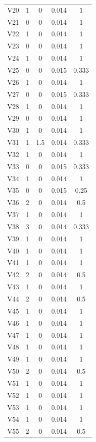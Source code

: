 \documentclass[a4paper, 12pt, openright, oneside, german, french, english, brazil]{abntex2}
\begin{document}
\begin{SingleSpace}
\begin{footnotesize}
\begin{center}
\begin{longtable}{c c c c c}
					V20 & 1 & 0 & 0.014 & 1 \\ 
					V21 & 0 & 0 & 0.014 & 1 \\ 
					V22 & 1 & 0 & 0.014 & 1 \\ 
					V23 & 0 & 0 & 0.014 & 1 \\ 
					V24 & 1 & 0 & 0.014 & 1 \\ 
					V25 & 0 & 0 & 0.015 & 0.333 \\ 
					V26 & 1 & 0 & 0.014 & 1 \\ 
					V27 & 0 & 0 & 0.015 & 0.333 \\ 
					V28 & 1 & 0 & 0.014 & 1 \\ 
					V29 & 0 & 0 & 0.014 & 1 \\ 
					V30 & 1 & 0 & 0.014 & 1 \\ 
					V31 & 1 & 1.5 & 0.014 & 0.333 \\ 
					V32 & 1 & 0 & 0.014 & 1 \\ 
					V33 & 0 & 0 & 0.015 & 0.333 \\ 
					V34 & 1 & 0 & 0.014 & 1 \\ 
					V35 & 0 & 0 & 0.015 & 0.25 \\ 
					V36 & 2 & 0 & 0.014 & 0.5 \\ 
					V37 & 1 & 0 & 0.014 & 1 \\ 
					V38 & 3 & 0 & 0.014 & 0.333 \\ 
					V39 & 1 & 0 & 0.014 & 1 \\ 
					V40 & 1 & 0 & 0.014 & 1 \\ 
					V41 & 1 & 0 & 0.014 & 1 \\ 
					V42 & 2 & 0 & 0.014 & 0.5 \\ 
					V43 & 1 & 0 & 0.014 & 1 \\ 
					V44 & 2 & 0 & 0.014 & 0.5 \\ 
					V45 & 1 & 0 & 0.014 & 1 \\ 
					V46 & 1 & 0 & 0.014 & 1 \\ 
					V47 & 1 & 0 & 0.014 & 1 \\ 
					V48 & 1 & 0 & 0.014 & 1 \\ 
					V49 & 1 & 0 & 0.014 & 1 \\ 
					V50 & 2 & 0 & 0.014 & 0.5 \\ 
					V51 & 1 & 0 & 0.014 & 1 \\ 
					V52 & 1 & 0 & 0.014 & 1 \\ 
					V53 & 1 & 0 & 0.014 & 1 \\ 
					V54 & 1 & 0 & 0.014 & 1 \\ 
					V55 & 2 & 0 & 0.014 & 0.5 \\ 

\end{longtable}
\end{center}
\end{footnotesize}
\end{SingleSpace}
\end{document}
